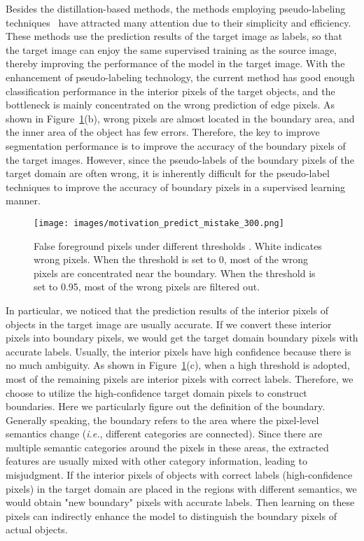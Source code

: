 \documentclass[sigconf]{acmart}
\begin{document}
	
	Besides the distillation-based methods, the methods employing pseudo-labeling techniques~\cite{tranheden2021dacs,melas2021pixmatch,zhou2021domain} have attracted many attention due to their simplicity and efficiency.
	These methods use the prediction results of the target image as labels, so that the target image can enjoy the same supervised training as the source image, thereby improving the performance of the model in the target image. With the enhancement of pseudo-labeling technology, the current method has good enough classification performance in the interior pixels of the target objects, and the bottleneck is mainly concentrated on the wrong prediction of edge pixels.
		As shown in Figure~\ref{figure:motivation_mistake}(b), wrong pixels are almost located in the boundary area, and the inner area of the object has few errors. Therefore, the key to improve segmentation performance is to improve the accuracy of the boundary pixels of the target images.
		However, since the pseudo-labels of the boundary pixels of the target domain are often wrong, it is inherently difficult for the pseudo-label techniques to improve the accuracy of boundary pixels in a supervised learning manner.
		\begin{figure}
			\centering
			\texttt{[image: images/motivation\_predict\_mistake\_300.png]}
			\vspace{-0.25cm}
			\caption{False foreground pixels under different thresholds . White indicates wrong pixels. When the threshold  is set to 0, most of the wrong pixels are concentrated near the boundary. When the threshold  is set to 0.95, most of the wrong pixels are filtered out.}
			\label{figure:motivation_mistake}
\end{figure}
		
In particular, we noticed that the prediction results of the interior pixels of objects in the target image are usually accurate. If we convert these interior pixels into boundary pixels, we would get the target domain boundary pixels with accurate labels. Usually, the interior pixels have high confidence because there is no much ambiguity. As shown in Figure~\ref{figure:motivation_mistake}(c), when a high threshold is adopted, most of the remaining pixels are interior pixels with correct labels. Therefore, we choose to utilize the high-confidence target domain pixels to construct boundaries. Here we particularly figure out the definition of the boundary. Generally speaking, the boundary refers to the area where the pixel-level semantics change (\textit{i.e.}, different categories are connected). Since there are multiple semantic categories around the pixels in these areas, the extracted features are usually mixed with other category information, leading to misjudgment. If the interior pixels of objects with correct labels (high-confidence pixels) in the target domain are placed in the regions with different semantics, we would obtain "new boundary" pixels with accurate labels. Then learning on these pixels can indirectly enhance the model to distinguish the boundary pixels of actual objects. 
\end{document}
